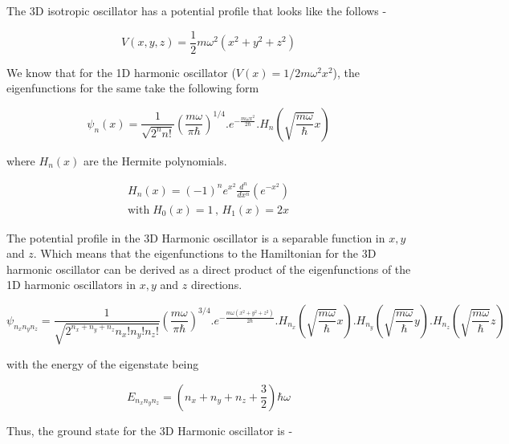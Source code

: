 \question
{}

    The 3D isotropic oscillator has a potential profile that looks like the follows - 

    \begin{equation*}
        V(x,y,z) = \frac{1}{2}m\omega^2(x^2 + y^2 + z^2)
    \end{equation*}

    We know that for the 1D harmonic oscillator ($V(x) = 1/2 m\omega^2x^2$), the eigenfunctions for the same take the following form

    \begin{equation*}
        \psi_n(x) = \frac{1}{\sqrt{2^nn!}} \left( \frac{m\omega}{\pi\hbar} \right)^{1/4} . e^{-\frac{m\omega x^2}{2\hbar}} . H_n \left( \sqrt{\frac{m\omega}{\hbar}} x \right)
    \end{equation*}

    where $H_n(x)$ are the Hermite polynomials.

    \begin{gather*}
        H_n(x) = (-1)^n e^{x^2} \frac{d^n}{dx^n} (e^{-x^2}) \\
        \text{with} \; H_0(x) = 1 \, , \, H_1(x) = 2x
    \end{gather*}

    The potential profile in the 3D Harmonic oscillator is a separable function in $x,y$ and $z$. Which means that the eigenfunctions to the Hamiltonian for the 3D harmonic oscillator can be derived as a direct product of the eigenfunctions of the 1D harmonic oscillators in $x,y$ and $z$ directions.

    \begin{equation*}
        \psi_{n_xn_yn_z} = \frac{1}{\sqrt{2^{n_x + n_y + n_z} n_x! n_y! n_z!}} \left( \frac{m\omega}{\pi\hbar} \right)^{3/4} . e^{-\frac{m\omega (x^2 + y^2 + z^2)}{2\hbar}} . H_{n_x} \left( \sqrt{\frac{m\omega}{\hbar}} x \right) . H_{n_y} \left( \sqrt{\frac{m\omega}{\hbar}} y \right) . H_{n_z} \left( \sqrt{\frac{m\omega}{\hbar}} z \right)
    \end{equation*}

    with the energy of the eigenstate being

    \begin{equation*}
        E_{n_xn_yn_z} = \left( n_x + n_y + n_z + \frac{3}{2} \right) \hbar\omega
    \end{equation*}

    Thus, the ground state for the 3D Harmonic oscillator is - 

